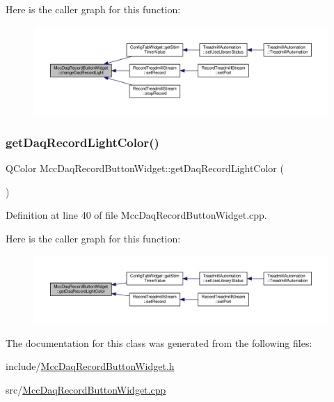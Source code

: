 Here is the caller graph for this function\+:
\nopagebreak
\begin{figure}[H]
\begin{center}
\leavevmode
\includegraphics[width=350pt]{class_mcc_daq_record_button_widget_af756c9d1918c871e907a032f3059e65d_icgraph}
\end{center}
\end{figure}
\mbox{\label{class_mcc_daq_record_button_widget_a9d3a8523e25ad34223a0ba94adbf61fb}} 
\subsubsection{\texorpdfstring{get\+Daq\+Record\+Light\+Color()}{getDaqRecordLightColor()}}
{\footnotesize\ttfamily Q\+Color Mcc\+Daq\+Record\+Button\+Widget\+::get\+Daq\+Record\+Light\+Color (\begin{DoxyParamCaption}{ }\end{DoxyParamCaption})}



Definition at line 40 of file Mcc\+Daq\+Record\+Button\+Widget.\+cpp.

Here is the caller graph for this function\+:
\nopagebreak
\begin{figure}[H]
\begin{center}
\leavevmode
\includegraphics[width=350pt]{class_mcc_daq_record_button_widget_a9d3a8523e25ad34223a0ba94adbf61fb_icgraph}
\end{center}
\end{figure}


The documentation for this class was generated from the following files\+:\begin{DoxyCompactItemize}
\item 
include/\hyperlink{_mcc_daq_record_button_widget_8h}{Mcc\+Daq\+Record\+Button\+Widget.\+h}\item 
src/\hyperlink{_mcc_daq_record_button_widget_8cpp}{Mcc\+Daq\+Record\+Button\+Widget.\+cpp}\end{DoxyCompactItemize}
